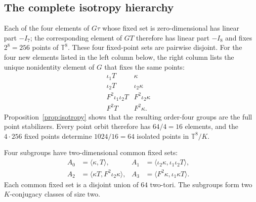 \documentclass[11pt]{article}
\theoremstyle{remark}\newtheorem{remark}[theorem]{Remark}
\newcommand{\T}{\mathbb T}
\begin{document}
\subsection{The complete isotropy hierarchy}
Each of the four elements of $G\tau$ whose fixed set is zero-dimensional
has linear part $-I_7$; the corresponding element of $GT$ therefore has
linear part $-I_8$ and fixes $2^8=256$ points of $\T^8$.  These four
fixed-point sets are pairwise disjoint.  For the four new elements listed
in the left column below, the right column lists the unique nonidentity
element of $G$ that fixes the same points:
\begin{equation}\label{eq:zero-old-stabilizer}
\begin{array}{c|c}
\iota_1T&\kappa\\ \iota_2T&\iota_2\kappa\\
F^2\iota_1\iota_2T&F^2\iota_2\kappa\\ F^2T&F^2\kappa.
\end{array}
\end{equation}
Proposition~\ref{prop:isotropy} shows that the resulting order-four groups
are the full point stabilizers.  Every point orbit therefore has
$64/4=16$ elements, and the $4\cdot256$ fixed points determine
$1024/16=64$ isolated points in $\T^8/K$.

Four subgroups have two-dimensional common fixed sets:
\begin{align}
A_0&=\langle\kappa,T\rangle,&
A_1&=\langle\iota_2\kappa,\iota_1\iota_2T\rangle,\label{eq:A01}\\
A_2&=\langle\kappa T,F^2\iota_2\kappa\rangle,&
A_3&=\langle F^2\kappa,\iota_1\kappa T\rangle.\label{eq:A23}
\end{align}
Each common fixed set is a disjoint union of $64$ two-tori.  The subgroups
form two $K$-conjugacy classes of size two.
\end{document}
